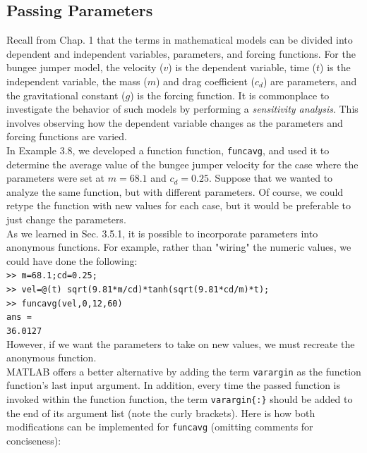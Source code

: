 \documentclass[../main.tex]{subfiles}
\begin{document}
\subsection{Passing Parameters}
\noindent
Recall from Chap. 1 that the terms in mathematical models can be divided into dependent
and independent variables, parameters, and forcing functions. For the bungee jumper
model, the velocity ($v$) is the dependent variable, time ($t$) is the independent variable, the
mass ($m$) and drag coefficient ($c_d$) are parameters, and the gravitational constant ($g$) is the
forcing function. It is commonplace to investigate the behavior of such models by performing
a \emph{sensitivity analysis}. This involves observing how the dependent variable changes
as the parameters and forcing functions are varied.\\
\indent In Example 3.8, we developed a function function, \texttt{funcavg}, and used it to determine
the average value of the bungee jumper velocity for the case where the parameters were set
at $m = 68.1$ and $c_d= 0.25$. Suppose that we wanted to analyze the same function, but with
different parameters. Of course, we could retype the function with new values for each
case, but it would be preferable to just change the parameters.\\
\indent As we learned in Sec. 3.5.1, it is possible to incorporate parameters into anonymous
functions. For example, rather than "wiring" the numeric values, we could have done the
following:\\

\texttt{>> m=68.1;cd=0.25;\\
\indent >> vel=@(t) sqrt(9.81*m/cd)*tanh(sqrt(9.81*cd/m)*t);\\
\indent >> funcavg(vel,0,12,60)\\
\indent ans =\\
\indent\hspace{2mm} 36.0127}\\

\noindent However, if we want the parameters to take on new values, we must recreate the anonymous
function.\\
\indent MATLAB offers a better alternative by adding the term \texttt{varargin} as the function
function's last input argument. In addition, every time the passed function is invoked
within the function function, the term \texttt{varargin\{:\}} should be added to the end of its
argument list (note the curly brackets). Here is how both modifications can be implemented
for \texttt{funcavg} (omitting comments for conciseness):\\
\end{document}
